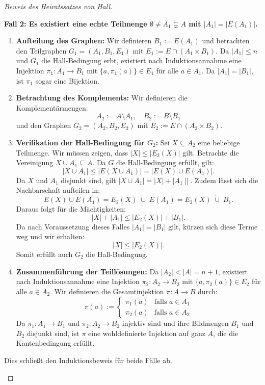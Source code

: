 \begin{proof}[Beweis des Heiratssatzes von Hall]
\begin{math-stroke}
\textbf{Fall 2: Es existiert eine echte Teilmenge $\emptyset \neq A_1 \subsetneq A$ mit $|A_1| = |E(A_1)|$.}
\begin{enumerate}[label=\textbf{\arabic*.}]
    \item \textbf{Aufteilung des Graphen:} Wir definieren $B_1 := E(A_1)$ und betrachten den Teilgraphen $G_1 = (A_1, B_1, E_1)$ mit $E_1 := E \cap (A_1 \times B_1)$. Da $|A_1| \le n$ und $G_1$ die Hall-Bedingung erbt, existiert nach Induktionsannahme eine Injektion $\pi_1 \colon A_1 \to B_1$ mit $\{a, \pi_1(a)\} \in E_1$ für alle $a \in A_1$. Da $|A_1| = |B_1|$, ist $\pi_1$ sogar eine Bijektion.
    \item \textbf{Betrachtung des Komplements:} Wir definieren die Komplementärmengen:
    \[
    A_2 := A \setminus A_1, \quad B_2 := B \setminus B_1
    \]
    und den Graphen $G_2 = (A_2, B_2, E_2)$ mit $E_2 := E \cap (A_2 \times B_2)$.
    \item \textbf{Verifikation der Hall-Bedingung für $G_2$:} Sei $X \subseteq A_2$ eine beliebige Teilmenge. Wir müssen zeigen, dass $|X| \le |E_2(X)|$ gilt.
    Betrachte die Vereinigung $X \cup A_1 \subseteq A$. Da $G$ die Hall-Bedingung erfüllt, gilt:
    \[
    |X \cup A_1| \le |E(X \cup A_1)| = |E(X) \cup E(A_1)|.
    \]
    Da $X$ und $A_1$ disjunkt sind, gilt $|X \cup A_1| = |X| + |A_1\|$. Zudem lässt sich die Nachbarschaft aufteilen in:
    \[
    E(X) \cup E(A_1) = E_2(X) \;\dot{\cup}\; E(A_1) = E_2(X) \;\dot{\cup}\; B_1.
    \]
    Daraus folgt für die Mächtigkeiten:
    \[
    |X| + |A_1| \le |E_2(X)| + |B_1|.
    \]
    Da nach Voraussetzung dieses Falles $|A_1| = |B_1|$ gilt, kürzen sich diese Terme weg und wir erhalten:
    \[
    |X| \le |E_2(X)|.
    \]
    Somit erfüllt auch $G_2$ die Hall-Bedingung.
    \item \textbf{Zusammenführung der Teillösungen:} Da $|A_2| < |A| = n+1$, existiert nach Induktionsannahme eine Injektion $\pi_2 \colon A_2 \to B_2$ mit $\{a, \pi_2(a)\} \in E_2$ für alle $a \in A_2$.
    Wir definieren die Gesamtinjektion $\pi \colon A \to B$ durch:
    \[
    \pi(a) := \begin{cases}
    \pi_1(a) & \text{falls } a \in A_1 \\
    \pi_2(a) & \text{falls } a \in A_2
    \end{cases}
    \]
    Da $\pi_1 \colon A_1 \to B_1$ und $\pi_2 \colon A_2 \to B_2$ injektiv sind und ihre Bildmengen $B_1$ und $B_2$ disjunkt sind, ist $\pi$ eine wohldefinierte Injektion auf ganz $A$, die die Kantenbedingung erfüllt.
\end{enumerate}
Dies schließt den Induktionsbeweis für beide Fälle ab.
\end{math-stroke}
\end{proof}

